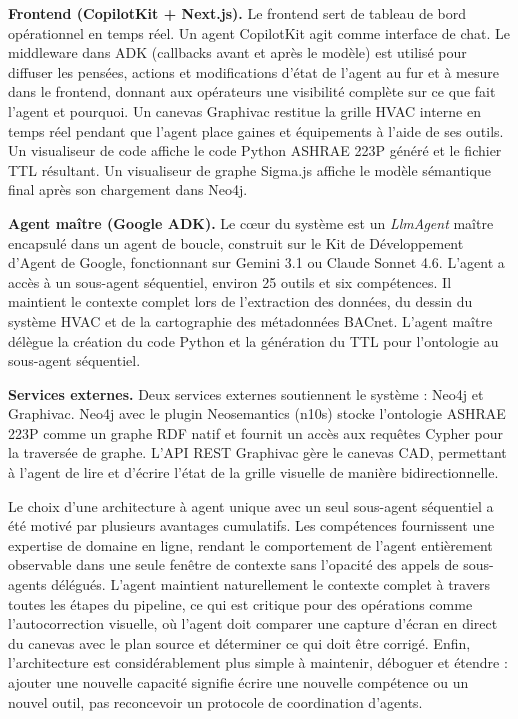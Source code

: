 \textbf{Frontend (CopilotKit + Next.js).}
Le frontend sert de tableau de bord opérationnel en temps réel. Un agent CopilotKit agit comme interface
de chat.
Le middleware dans ADK (callbacks avant et après le modèle) est utilisé pour diffuser les pensées, actions
et modifications d'état de l'agent au fur et à mesure dans le frontend, donnant aux opérateurs une
visibilité complète sur ce que fait l'agent et pourquoi.
Un canevas Graphivac restitue la grille HVAC interne en temps réel pendant que l'agent place gaines et
équipements à l'aide de ses outils.
Un visualiseur de code affiche le code Python ASHRAE 223P généré et le fichier TTL résultant.
Un visualiseur de graphe Sigma.js affiche le modèle sémantique final après son chargement dans Neo4j.

\textbf{Agent maître (Google ADK).}
Le cœur du système est un \textit{LlmAgent} maître encapsulé dans un agent de boucle, construit sur le
Kit de Développement d'Agent de Google, fonctionnant sur Gemini 3.1 ou Claude Sonnet 4.6. L'agent a accès
à un sous-agent séquentiel, environ 25 outils et six compétences.
Il maintient le contexte complet lors de l'extraction des données, du dessin du système HVAC et de la
cartographie des métadonnées BACnet.
L'agent maître délègue la création du code Python et la génération du TTL pour l'ontologie au sous-agent
séquentiel.

\textbf{Services externes.}
Deux services externes soutiennent le système : Neo4j et Graphivac. Neo4j avec le plugin Neosemantics (n10s)
stocke l'ontologie ASHRAE 223P comme un graphe RDF natif et fournit un accès aux requêtes Cypher
pour la traversée de graphe. L'API REST Graphivac gère le canevas CAD, permettant à l'agent
de lire et d'écrire l'état de la grille visuelle de manière bidirectionnelle.

\medskip
\noindent
Le choix d'une architecture à agent unique avec un seul sous-agent séquentiel a été motivé par plusieurs
avantages cumulatifs.
Les compétences fournissent une expertise de domaine en ligne, rendant le comportement de l'agent
entièrement observable dans une seule fenêtre de contexte sans l'opacité des appels de sous-agents
délégués.
L'agent maintient naturellement le contexte complet à travers toutes les étapes du pipeline, ce qui est
critique pour des opérations comme l'autocorrection visuelle, où l'agent doit comparer une capture
d'écran en direct du canevas avec le plan source et déterminer ce qui doit être corrigé.
Enfin, l'architecture est considérablement plus simple à maintenir, déboguer et étendre : ajouter une
nouvelle capacité signifie écrire une nouvelle compétence ou un nouvel outil, pas reconcevoir un protocole
de coordination d'agents.

